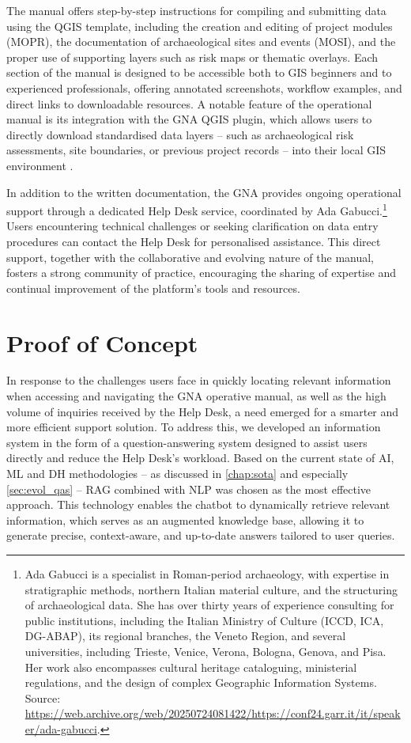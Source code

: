 \begin{spacing}{1.5}
The manual offers step-by-step instructions for compiling and submitting data using the QGIS template, including the creation and editing of project modules (MOPR), the documentation of archaeological sites and events (MOSI), and the proper use of supporting layers such as risk maps or thematic overlays. Each section of the manual is designed to be accessible both to GIS beginners and to experienced professionals, offering annotated screenshots, workflow examples, and direct links to downloadable resources. A notable feature of the operational manual is its integration with the GNA QGIS plugin, which allows users to directly download standardised data layers -- such as archaeological risk assessments, site boundaries, or previous project records -- into their local GIS environment \citep{gabucci_template_2023}.

In addition to the written documentation, the GNA provides ongoing operational support through a dedicated Help Desk service, coordinated by Ada Gabucci.\footnote{Ada Gabucci is a specialist in Roman-period archaeology, with expertise in stratigraphic methods, northern Italian material culture, and the structuring of archaeological data. She has over thirty years of experience consulting for public institutions, including the Italian Ministry of Culture (ICCD, ICA, DG-ABAP), its regional branches, the Veneto Region, and several universities, including Trieste, Venice, Verona, Bologna, Genova, and Pisa. Her work also encompasses cultural heritage cataloguing, ministerial regulations, and the design of complex Geographic Information Systems.\\Source: \url{https://web.archive.org/web/20250724081422/https://conf24.garr.it/it/speaker/ada-gabucci}.\nocite{noauthor_ada_2025}} Users encountering technical challenges or seeking clarification on data entry procedures can contact the Help Desk for personalised assistance. This direct support, together with the collaborative and evolving nature of the manual, fosters a strong community of practice, encouraging the sharing of expertise and continual improvement of the platform’s tools and resources.

\section{Proof of Concept}
In response to the challenges users face in quickly locating relevant information when accessing and navigating the GNA operative manual, as well as the high volume of inquiries received by the Help Desk, a need emerged for a smarter and more efficient support solution. To address this, we developed an information system in the form of a question-answering system designed to assist users directly and reduce the Help Desk’s workload. Based on the current state of AI, ML and DH methodologies -- as discussed in \autoref{chap:sota} and especially \autoref{sec:evol_qas} -- RAG combined with NLP was chosen as the most effective approach. This technology enables the chatbot to dynamically retrieve relevant information, which serves as an augmented knowledge base, allowing it to generate precise, context-aware, and up-to-date answers tailored to user queries.


\end{spacing}
